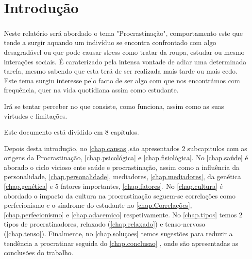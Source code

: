 \documentclass{report}
\begin{document}
\tableofcontents


\clearpage
{}

\chapter{Introdução}
\label{chap.introducao}

\paragraph{}
Neste relatório será abordado o tema "Procrastinação", comportamento este que tende a surgir aquando um indivíduo se encontra confrontado com algo desagradável ou que pode causar stress como tratar da roupa, estudar ou mesmo interações sociais. É caraterizado pela intensa vontade de adiar uma determinada tarefa, mesmo sabendo que esta terá de ser realizada mais tarde ou mais cedo. Este tema surgiu interesse pelo facto de ser algo com que nos encontrámos com frequência, quer na vida quotidiana assim como estudante.
\par
Irá se tentar perceber no que consiste, como funciona, assim como as suas virtudes e limitações.
\par

Este documento está dividido em 8 capítulos.
\par
Depois desta introdução,
no \autoref{chap.causas},são apresentados 2 subcapitulos com as origens da Procrastinação, \autoref{chap.psicológica} e  \autoref{chap.fisiológica}. No \autoref{chap.saúde} é aborado o ciclo vicioso ente saúde e procrastinação, assim como a influência da personalidade, \autoref{chap.personalidade},  mediadores, \autoref{chap.mediadores}, da genética \autoref{chap.genética} e 5 fatores importantes, \autoref{chap.fatores}. No \autoref{chap.cultura} é abordado o impacto da cultura na procrastinação seguem-se correlações como perfecionismo e o síndrome do estudante no \autoref{chap.Correlações}, \autoref{chap.perfecionismo} e \autoref{chap.adacemico} respetivamente. No \autoref{chap.tipos} temos 2 tipos de procratinadores, relaxado (\autoref{chap.relaxado}) e tenso-nervoso (\autoref{chap.tenso}).
Finalmente, no \autoref{chap.soluçoes} temos sugestões para reduzir a tendência a procratinar seguida do \autoref{chap.conclusao} , onde são apresentadas as conclusões do trabalho.
\end{document}
